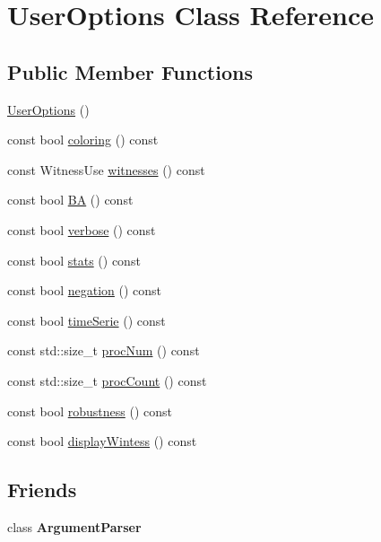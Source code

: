 \hypertarget{class_user_options}{\section{User\-Options Class Reference}
\label{class_user_options}
}
\subsection*{Public Member Functions}
\begin{DoxyCompactItemize}
\item 
\hyperlink{class_user_options_a477c8d918c09c047e22fee763478b47e}{User\-Options} ()
\item 
const bool \hyperlink{class_user_options_a65a68897bec22af5b3c22584b0278653}{coloring} () const 
\item 
const Witness\-Use \hyperlink{class_user_options_a8dc4280fa26348e32a71dfab33129442}{witnesses} () const 
\item 
const bool \hyperlink{class_user_options_a2c219b57db5025cd73881a2772968e71}{B\-A} () const 
\item 
const bool \hyperlink{class_user_options_a4065d6667a4abfb788719c883467bdd3}{verbose} () const 
\item 
const bool \hyperlink{class_user_options_add1b18c6f6da336a4de7f91e7b15a47c}{stats} () const 
\item 
const bool \hyperlink{class_user_options_a8e3a3979887d8a762efcb1aae5a41282}{negation} () const 
\item 
const bool \hyperlink{class_user_options_a0729336239e1296d9197e7269219f147}{time\-Serie} () const 
\item 
const std\-::size\-\_\-t \hyperlink{class_user_options_ab2b950a876a0e0b15745282a90afe9f5}{proc\-Num} () const 
\item 
const std\-::size\-\_\-t \hyperlink{class_user_options_a1459ce2a6ee5d5528d8e198bb3fd01e5}{proc\-Count} () const 
\item 
const bool \hyperlink{class_user_options_a38b77653f05018f577d93a53ab97afd0}{robustness} () const 
\item 
const bool \hyperlink{class_user_options_a977e8915d10bb5f4e6bca21d21fc5c30}{display\-Wintess} () const 
\end{DoxyCompactItemize}
\subsection*{Friends}
\begin{DoxyCompactItemize}
\item 
\hypertarget{class_user_options_a55c9e1ac006a645af402e3aee6b64e00}{class {\bfseries Argument\-Parser}}\label{class_user_options_a55c9e1ac006a645af402e3aee6b64e00}

\end{DoxyCompactItemize}


